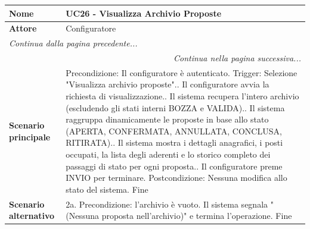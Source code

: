 \documentclass[12pt, a4paper, oneside]{report}
\begin{document}
\begin{tabularx}{\textwidth}{|l|X|}
    \hline
    \textbf{Nome}               & \textbf{UC26 - Visualizza Archivio Proposte} \\ \hline
    \textbf{Attore}             & Configuratore \\ \hline
    \endfirsthead 
    \hline
    \multicolumn{2}{|l|}{\textit{Continua dalla pagina precedente...}} \\ \hline
    \endhead 
    \hline
    \multicolumn{2}{|r|}{\textit{Continua nella pagina successiva...}} \\ \hline
    \endfoot 
    \hline
    \endlastfoot
    \textbf{Scenario principale} & 
    Precondizione: Il configuratore è autenticato.\newline
    Trigger: Selezione "Visualizza archivio proposte".\newline
    1. Il configuratore avvia la richiesta di visualizzazione.\newline
    2. Il sistema recupera l'intero archivio (escludendo gli stati interni BOZZA e VALIDA).\newline
    3. Il sistema raggruppa dinamicamente le proposte in base allo stato (APERTA, CONFERMATA, ANNULLATA, CONCLUSA, RITIRATA).\newline
    4. Il sistema mostra i dettagli anagrafici, i posti occupati, la lista degli aderenti e lo storico completo dei passaggi di stato per ogni proposta.\newline
    5. Il configuratore preme INVIO per terminare.\newline
    Postcondizione: Nessuna modifica allo stato del sistema.\newline
    Fine \\ \hline 
    \textbf{Scenario alternativo} & 
    2a. Precondizione: l'archivio è vuoto.\newline
    Il sistema segnala "(Nessuna proposta nell'archivio)" e termina l'operazione.\newline
    Fine \\ \hline
\end{tabularx}
\end{document}
